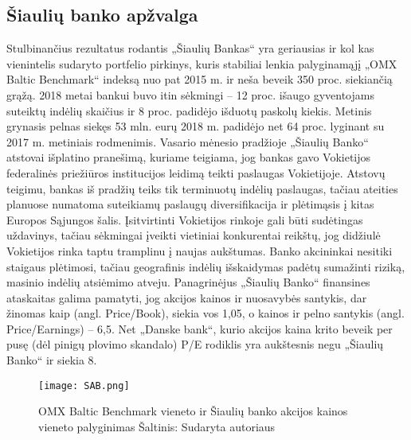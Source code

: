 \documentclass[titlepage, 11pt]{article}
\begin{document}
\subsection{Šiaulių banko apžvalga}

Stulbinančius rezultatus rodantis „Šiaulių Bankas“ yra geriausias ir kol kas vienintelis sudaryto portfelio pirkinys, kuris stabiliai lenkia palyginamąjį „OMX Baltic Benchmark“ indeksą nuo pat 2015 m. ir neša beveik 350 proc. siekiančią grąžą. 2018 metai bankui buvo itin sėkmingi – 12 proc. išaugo gyventojams suteiktų indėlių skaičius ir 8 proc. padidėjo išduotų paskolų kiekis. Metinis grynasis pelnas siekęs 53 mln. eurų 2018 m. padidėjo net 64 proc. lyginant su 2017 m. metiniais rodmenimis. Vasario mėnesio pradžioje „Šiaulių Banko“ atstovai išplatino pranešimą, kuriame teigiama, jog bankas gavo Vokietijos federalinės priežiūros institucijos leidimą teikti paslaugas Vokietijoje. Atstovų teigimu, bankas iš pradžių teiks tik terminuotų indėlių paslaugas, tačiau ateities planuose numatoma suteikiamų paslaugų diversifikacija ir plėtimąsis į kitas Europos Sąjungos šalis. Įsitvirtinti Vokietijos rinkoje gali būti sudėtingas uždavinys, tačiau sėkmingai įveikti vietiniai konkurentai reikštų, jog didžiulė Vokietijos rinka taptu tramplinu į naujas aukštumas. Banko akcininkai nesitiki staigaus plėtimosi, tačiau geografinis indėlių išskaidymas padėtų sumažinti riziką, masinio indėlių atsiėmimo atveju. Panagrinėjus „Šiaulių Banko“ finansines ataskaitas galima pamatyti, jog akcijos kainos ir nuosavybės santykis, dar žinomas kaip (angl. Price/Book), siekia vos 1,05, o kainos ir pelno santykis (angl. Price/Earnings) – 6,5. Net „Danske bank“, kurio akcijos kaina krito beveik per pusę (dėl pinigų plovimo skandalo) P/E rodiklis yra aukštesnis negu „Šiaulių Banko“ ir siekia 8. 

\begin{figure}[H]
\captionsetup{justification=centering}
\center
\texttt{[image: SAB.png]}
\caption{OMX Baltic Benchmark vieneto ir Šiaulių banko akcijos kainos vieneto palyginimas \newline
Šaltinis: Sudaryta autoriaus}
\end{figure}
\end{document}
